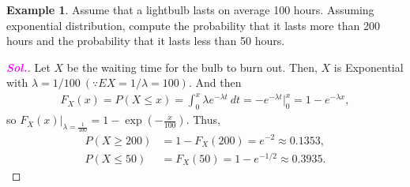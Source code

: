 \documentclass[12pt,a4paper]{article}
\theoremstyle{definition}
\newtheorem{example}{Example}[section]
\theoremstyle{definition}
\theoremstyle{definition}
\theoremstyle{definition}
\theoremstyle{remark}
\theoremstyle{definition}
\newcommand{\dispsty}{\displaystyle}
\newcommand{\sol}{\textcolor{magenta}{\bf \textit{Sol.}}\quad}
\begin{document}
\begin{example}
	Assume that a lightbulb lasts on average 100 hours. Assuming exponential distribution, compute the probability that it lasts more than 200 hours and the probability that it lasts less than 50 hours.
	\begin{proof}[\sol]
		Let $X$ be the waiting time for the bulb to burn out. Then, $X$ is Exponential with $\lambda=1/100\ (\because EX=1/\lambda=100)$. And then \begin{align*}
		F_X(x)=P(X\leq x)=\int_0^x\lambda e^{-\lambda t}\ dt=-e^{-\lambda t}\Bigg|_0^x=1-e^{-\lambda x},
		\end{align*} so $\dispsty
		F_X(x)\Bigg|_{\lambda=\frac{1}{100}}=1-\exp\left(-\frac{x}{100}\right)$. Thus, \begin{align*}
		P(X\geq 200)&=1-F_X(200)=e^{-2}\approx 0.1353,\\
		P(X\leq 50)&=F_X(50)=1-e^{-1/2}\approx0.3935.
		\end{align*}
	\end{proof}
\end{example}
\newpage
\end{document}
